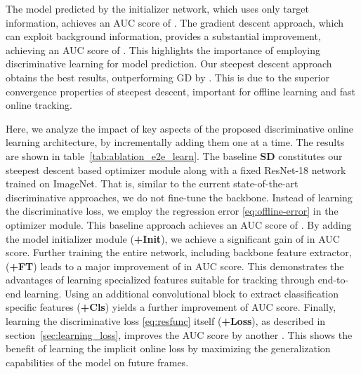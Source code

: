 \documentclass[10pt,twocolumn,letterpaper]{article}
\begin{document}
The model predicted by the initializer network, which uses only target information, achieves an AUC score of . The gradient descent approach, which can exploit background information, provides a substantial improvement, achieving an AUC score of . This highlights the importance of employing discriminative learning for model prediction. Our steepest descent approach obtains the best results, outperforming GD by . This is due to the superior convergence properties of steepest descent, important for offline learning and fast online tracking.


\begin{table}[!t]
	\centering\vspace{-1mm}
	\vspace{1mm}\caption{
		Analysis of the impact of initializer module (\textbf{+Init}), training the backbone (\textbf{+FT}), using extra conv. block (\textbf{+Cls}) and offline learning of the loss (\textbf{+Loss}), by incrementally adding them one at a time. The baseline \textbf{SD} constitutes our steepest descent based optimizer module along with a ResNet-18 trained on ImageNet.
	}
	\label{tab:ablation_e2e_learn}\vspace{-4mm}
\end{table}

 Here, we analyze the impact of key aspects of the proposed discriminative online learning architecture, by incrementally adding them one at a time. The results are shown in table~\ref{tab:ablation_e2e_learn}. The baseline \textbf{SD} constitutes our steepest descent based optimizer module along with a fixed ResNet-18 network trained on ImageNet. That is, similar to the current state-of-the-art discriminative approaches, we do not fine-tune the backbone. Instead of learning the discriminative loss, we employ the regression error \eqref{eq:offline-error} in the optimizer module. This baseline approach achieves an AUC score of . By adding the model initializer module (\textbf{+Init}), we achieve a significant gain of  in AUC score. Further training the entire network, including backbone feature extractor, (\textbf{+FT}) leads to a major improvement of  in AUC score. This demonstrates the advantages of learning specialized features suitable for tracking through end-to-end learning. Using an additional convolutional block to extract classification specific features (\textbf{+Cls}) yields a further improvement of  AUC score. Finally, learning the discriminative loss \eqref{eq:resfunc} itself (\textbf{+Loss}), as described in section~\ref{sec:learning_loss}, improves the AUC score by another . This shows the benefit of learning the implicit online loss by maximizing the generalization capabilities of the model on future frames.
\end{document}
